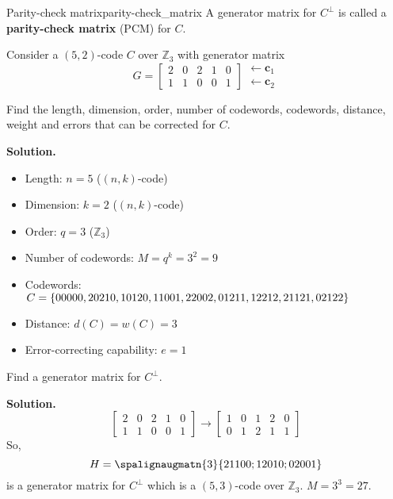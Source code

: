 \begin{Definition}{Parity-check matrix}{parity-check_matrix}
    A generator matrix for $ C^{\perp} $ is called a \textbf{parity-check matrix}
    (PCM) for $ C $.
\end{Definition}

\begin{Example}{}{}
    Consider a $ (5,2) $-code $ C $ over $ \mathbb{Z}_3 $ with generator matrix
    \[ G=
        \begin{bmatrix}
            2 & 0 & 2 & 1 & 0 \\
            1 & 1 & 0 & 0 & 1
        \end{bmatrix}
        \begin{matrix}
            \leftarrow \bm{c}_1 \\
            \leftarrow \bm{c}_2
        \end{matrix} \]

    Find the length, dimension, order, number of codewords, codewords,
    distance, weight and errors that can be corrected for $ C $.

    \textbf{Solution.}
    \begin{itemize}
        \item Length: $ n=5 $ ($ (n,k) $-code)
        \item Dimension: $ k=2 $ ($ (n,k) $-code)
        \item Order: $ q=3 $ ($ \mathbb{Z}_3 $)
        \item Number of codewords: $ M=q^k=3^2=9 $
        \item Codewords: $ C=\{00000,20210,10120,11001,22002,01211,12212,21121,02122\} $
        \item Distance: $ d(C)=w(C)=3 $
        \item Error-correcting capability: $ e=1 $
    \end{itemize}

    Find a generator matrix for $ C^{\perp} $.

    \textbf{Solution.}
    \[\begin{bmatrix}
            2 & 0 & 2 & 1 & 0 \\
            1 & 1 & 0 & 0 & 1
        \end{bmatrix}\rightarrow
        \begin{bmatrix}
            1 & 0 & 1 & 2 & 0 \\
            0 & 1 & 2 & 1 & 1
        \end{bmatrix}\]
    So,
    \[ H=
        \spalignaugmatn{3}{
            2 1 1 0 0;
            1 2 0 1 0;
            0 2 0 0 1
        }
    \]
    is a generator matrix for $ C^{\perp} $ which is a $ (5,3) $-code
    over $ \mathbb{Z}_3 $. $ M=3^3=27 $.
\end{Example}

